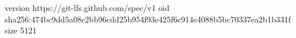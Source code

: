 version https://git-lfs.github.com/spec/v1
oid sha256:474bc9dd5a08c2bb96cdd25b954f93e425f6c914e4088b5bc70337ea2b1b331f
size 5121
